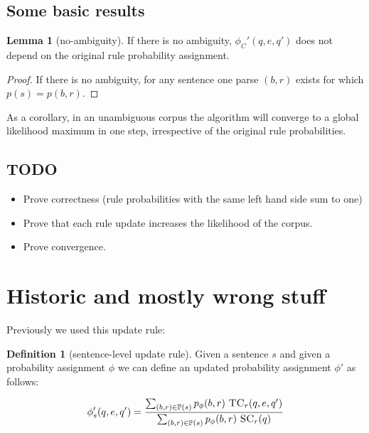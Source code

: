 \documentclass[12pt]{article}
\theoremstyle{definition}
\newtheorem{definition}{Definition}[section]
\newtheorem{lemma}{Lemma}[section]
\begin{document}
\subsection{Some basic results}

\begin{lemma}[no-ambiguity]
  If there is no ambiguity, $\phi_C'(q,e,q')$ does not depend on the original rule probability assignment.
\end{lemma}

\begin{proof}
  If there is no ambiguity, for any sentence one parse $(b,r)$ exists for which $p(s)=p(b,r)$.
\end{proof}

As a corollary, in an unambiguous corpus the algorithm will converge to a global likelihood maximum in one step, irrespective of the original rule probabilities.







\subsection{TODO}
\begin{itemize}
\item Prove correctness (rule probabilities with the same left hand side sum to one)
\item Prove that each rule update increases the likelihood of the corpus.
\item Prove convergence.
\end{itemize}



\section{Historic and mostly wrong stuff}

Previously we used this update rule:

\begin{definition}[sentence-level update rule]
  Given a sentence $s$ and given a probability assignment $\phi$ we can define an updated probability assignment $\phi'$ as follows:

  $$\phi_s'(q,e,q') = \frac{\sum_{(b,r)\in\mathbb{P}(s)}p_\phi(b,r)~\textsc{TC}_r(q,e,q')}{\sum_{(b,r)\in\mathbb{P}(s)}p_\phi(b,r)~\textsc{SC}_r(q)}$$
\end{definition}

%
\end{document}
